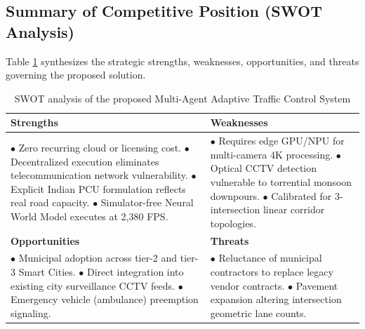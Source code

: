 \subsection{Summary of Competitive Position (SWOT Analysis)}
Table \ref{tab:ch5_swot} synthesizes the strategic strengths, weaknesses, opportunities, and threats governing the proposed solution.

\begin{table}[htbp]
\centering
\small
\caption{SWOT analysis of the proposed Multi-Agent Adaptive Traffic Control System}
\label{tab:ch5_swot}
\begin{tabularx}{\textwidth}{|X|X|}
\hline
\textbf{Strengths} & \textbf{Weaknesses} \\ \hline
$\bullet$ Zero recurring cloud or licensing cost. \newline
$\bullet$ Decentralized execution eliminates telecommunication network vulnerability. \newline
$\bullet$ Explicit Indian PCU formulation reflects real road capacity. \newline
$\bullet$ Simulator-free Neural World Model executes at 2,380 FPS. & 
$\bullet$ Requires edge GPU/NPU for multi-camera 4K processing. \newline
$\bullet$ Optical CCTV detection vulnerable to torrential monsoon downpours. \newline
$\bullet$ Calibrated for 3-intersection linear corridor topologies. \\ \hline
\textbf{Opportunities} & \textbf{Threats} \\ \hline
$\bullet$ Municipal adoption across tier-2 and tier-3 Smart Cities. \newline
$\bullet$ Direct integration into existing city surveillance CCTV feeds. \newline
$\bullet$ Emergency vehicle (ambulance) preemption signaling. & 
$\bullet$ Reluctance of municipal contractors to replace legacy vendor contracts. \newline
$\bullet$ Pavement expansion altering intersection geometric lane counts. \\ \hline
\end{tabularx}
\end{table}
